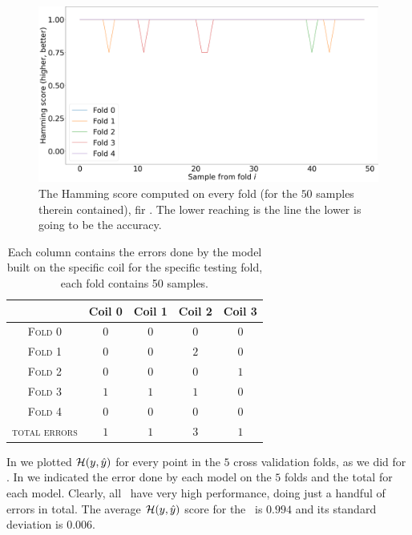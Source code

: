 \begin{figure}[!ht]
	\centering
	\includegraphics[width=0.7\linewidth]{img/svc_qlp_hs.png}
	\caption{The Hamming score computed on every fold (for the $50$ samples therein contained),
	fir \svcs. The lower reaching is the line the lower is going to be the accuracy.}
	\label{fig:svc-qlp-hs}
\end{figure}
\begin{table}[!ht]
	\setlength{\tabcolsep}{6pt}
	\centering
	\begin{tabular}{ccccc}
		\toprule
		\textbf{}                     & \textbf{Coil 0}    & \textbf{Coil 1} & \textbf{Coil 2} & \textbf{Coil 3}
		\\
		\midrule
		\textsc{Fold 0}         & $0$           & $0$           & $0$            & $0$            \\
		\textsc{Fold 1}         & $0$		& $0$		& $2$            & $0$		  \\
		\textsc{Fold 2}		& $0$           & $0$		& $0$            & $1$            \\
		\textsc{Fold 3}         & $1$           & $1$ 		& $1$            & $0$            \\
		\textsc{Fold 4}         & $0$		& $0$           & $0$            & $0$            \\
		\midrule
		\textsc{total errors}	& $1$		& $1$		& $3$		& $1$
		\\
		\bottomrule
	\end{tabular}
	\caption{Each column contains the errors done by the model built on the specific coil for the specific testing fold, each fold contains 50 samples.}\label{tbl:svc-err}
\end{table}

In  we plotted $\mathcal{H}(y, \hat{y})$ for every point in the $5$ cross validation folds, as we
did for \dts. In  we indicated the error done by each model on the $5$ folds and
the total for each model. Clearly, all \svcs\ have very high performance, doing just a handful of
errors in total. The average $\mathcal{H}(y, \hat{y})$ score for the \svc\ is $0.994$ and its standard deviation is $0.006$.




